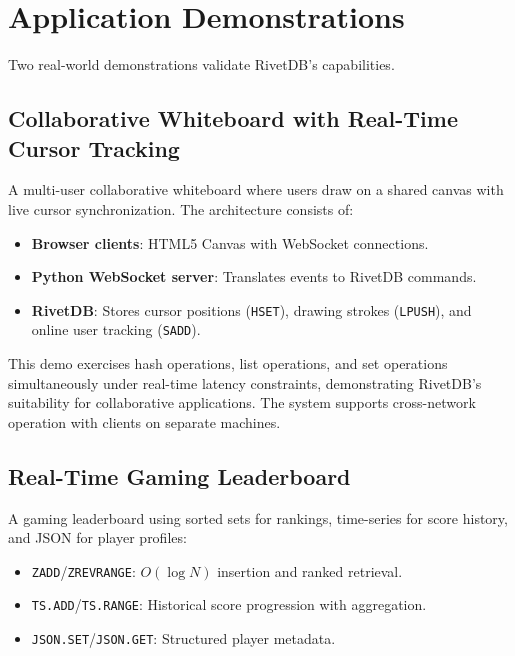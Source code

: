 \documentclass[conference,a4paper]{IEEEtran}
\begin{document}
\section{Application Demonstrations}

Two real-world demonstrations validate RivetDB's capabilities.

\subsection{Collaborative Whiteboard with Real-Time Cursor Tracking}

A multi-user collaborative whiteboard where users draw on a shared canvas with live cursor synchronization. The architecture consists of:

\begin{itemize}
    \item \textbf{Browser clients}: HTML5 Canvas with WebSocket connections.
    \item \textbf{Python WebSocket server}: Translates events to RivetDB commands.
    \item \textbf{RivetDB}: Stores cursor positions (\texttt{HSET}), drawing strokes (\texttt{LPUSH}), and online user tracking (\texttt{SADD}).
\end{itemize}

This demo exercises hash operations, list operations, and set operations simultaneously under real-time latency constraints, demonstrating RivetDB's suitability for collaborative applications. The system supports cross-network operation with clients on separate machines.

\subsection{Real-Time Gaming Leaderboard}

A gaming leaderboard using sorted sets for rankings, time-series for score history, and JSON for player profiles:

\begin{itemize}
    \item \texttt{ZADD}/\texttt{ZREVRANGE}: $O(\log N)$ insertion and ranked retrieval.
    \item \texttt{TS.ADD}/\texttt{TS.RANGE}: Historical score progression with aggregation.
    \item \texttt{JSON.SET}/\texttt{JSON.GET}: Structured player metadata.
\end{itemize}
\end{document}
